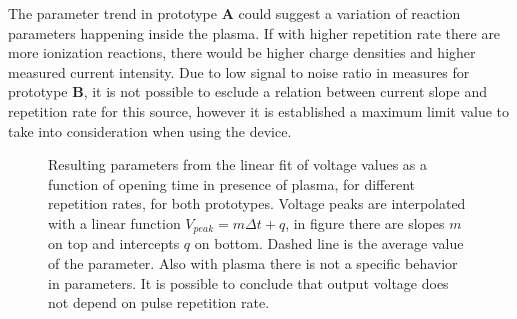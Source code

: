 The parameter trend in prototype \textbf{A} could suggest a variation of reaction parameters happening inside the plasma. If with higher repetition rate there are more ionization reactions, there would be higher charge densities and higher measured current intensity. Due to low signal to noise ratio in measures for prototype \textbf{B}, it is not possible to esclude a relation between current slope and repetition rate for this source, however it is established a maximum limit value to take into consideration when using the device.
\begin{figure}
 \centering
 \hfill
 \caption{Resulting parameters from the linear fit of voltage values as a function of opening time in presence of plasma, for different repetition rates, for both prototypes. Voltage peaks are interpolated with a linear function $V_{peak} = m \Delta t + q$, in figure there are slopes $m$ on top and intercepts $q$ on bottom. Dashed line is the average value of the parameter. Also with plasma there is not a  specific behavior in parameters. It is possible to conclude that output voltage does not depend on pulse repetition rate.}
 \label{fig:lingas_Vpp}
\end{figure}


